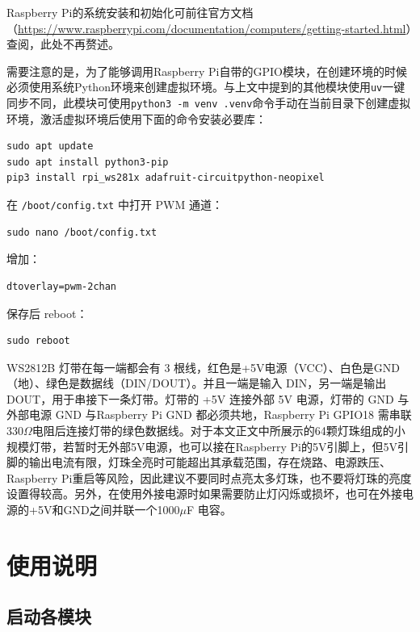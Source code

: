 \documentclass[bachelor]{njupthesis}
\begin{document}
Raspberry Pi的系统安装和初始化可前往官方文档（\url{https://www.raspberrypi.com/documentation/computers/getting-started.html}）查阅，此处不再赘述。

需要注意的是，为了能够调用Raspberry Pi自带的GPIO模块，在创建环境的时候必须使用系统Python环境来创建虚拟环境。与上文中提到的其他模块使用\texttt{uv}一键同步不同，此模块可使用\texttt{python3 -m venv .venv}命令手动在当前目录下创建虚拟环境，激活虚拟环境后使用下面的命令安装必要库：

\lstset{style=codeblock}\begin{lstlisting}
sudo apt update
sudo apt install python3-pip
pip3 install rpi_ws281x adafruit-circuitpython-neopixel
\end{lstlisting}

在 \texttt{/boot/config.txt} 中打开 PWM 通道：

\lstset{style=codeblock}\begin{lstlisting}
sudo nano /boot/config.txt
\end{lstlisting}

增加：

\lstset{style=codeblock}\begin{lstlisting}
dtoverlay=pwm-2chan
\end{lstlisting}

保存后 reboot：

\lstset{style=codeblock}\begin{lstlisting}
sudo reboot
\end{lstlisting}

WS2812B 灯带在每一端都会有 3 根线，红色是+5V电源（VCC）、白色是GND（地）、绿色是数据线（DIN/DOUT）。并且一端是输入 DIN，另一端是输出 DOUT，用于串接下一条灯带。灯带的 +5V 连接外部 5V 电源，灯带的 GND 与外部电源 GND 与Raspberry Pi GND 都必须共地，Raspberry Pi GPIO18 需串联 330$\Omega$电阻后连接灯带的绿色数据线。对于本文正文中所展示的64颗灯珠组成的小规模灯带，若暂时无外部5V电源，也可以接在Raspberry Pi的5V引脚上，但5V引脚的输出电流有限，灯珠全亮时可能超出其承载范围，存在烧路、电源跌压、Raspberry Pi重启等风险，因此建议不要同时点亮太多灯珠，也不要将灯珠的亮度设置得较高。另外，在使用外接电源时如果需要防止灯闪烁或损坏，也可在外接电源的+5V和GND之间并联一个1000$\mu$F 电容。

\section{使用说明}

\subsection{启动各模块}
\end{document}
